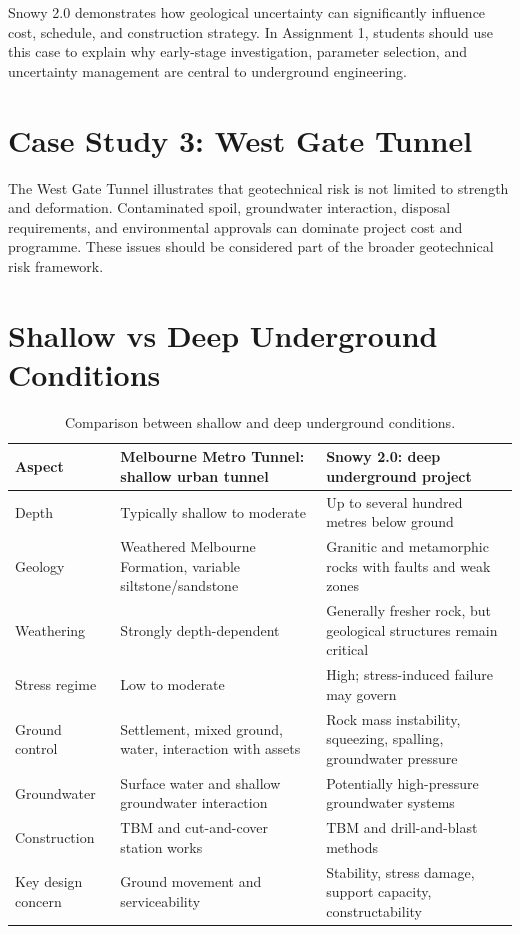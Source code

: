 \documentclass[a4paper,12pt]{article}
\begin{document}
\begin{warnbox}
Snowy 2.0 demonstrates how geological uncertainty can significantly influence cost, schedule, and construction strategy. In Assignment 1, students should use this case to explain why early-stage investigation, parameter selection, and uncertainty management are central to underground engineering.
\end{warnbox}

\section{Case Study 3: West Gate Tunnel}

\begin{warnbox}
The West Gate Tunnel illustrates that geotechnical risk is not limited to strength and deformation. Contaminated spoil, groundwater interaction, disposal requirements, and environmental approvals can dominate project cost and programme. These issues should be considered part of the broader geotechnical risk framework.
\end{warnbox}

\section{Shallow vs Deep Underground Conditions}

\begin{table}[H]
\centering
\small
\begin{tabularx}{\textwidth}{l X X}
\toprule
\textbf{Aspect} & \textbf{Melbourne Metro Tunnel: shallow urban tunnel} & \textbf{Snowy 2.0: deep underground project} \\
\midrule
Depth & Typically shallow to moderate & Up to several hundred metres below ground \\
Geology & Weathered Melbourne Formation, variable siltstone/sandstone & Granitic and metamorphic rocks with faults and weak zones \\
Weathering & Strongly depth-dependent & Generally fresher rock, but geological structures remain critical \\
Stress regime & Low to moderate & High; stress-induced failure may govern \\
Ground control & Settlement, mixed ground, water, interaction with assets & Rock mass instability, squeezing, spalling, groundwater pressure \\
Groundwater & Surface water and shallow groundwater interaction & Potentially high-pressure groundwater systems \\
Construction & TBM and cut-and-cover station works & TBM and drill-and-blast methods \\
Key design concern & Ground movement and serviceability & Stability, stress damage, support capacity, constructability \\
\bottomrule
\end{tabularx}
\caption{Comparison between shallow and deep underground conditions.}
\end{table}
\end{document}
